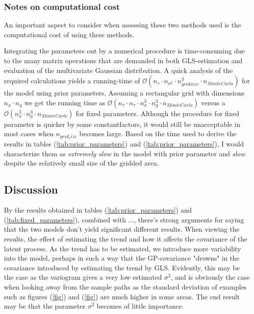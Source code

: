 \subsubsection{Notes on computational cost}
An important aspect to consider when assessing these two methods used is the computational cost of using these methods. 

Integrating the parameters out by a numerical procedure is time-consuming due to the many matrix operations that are demanded in both GLS-estimation and evaluation of the multivariate Gaussian distribution. A quick analysis of the required calculations yields a running-time of $\mathcal{O}(n_{\tau} \cdot n_{\sigma^2} \cdot n_{grid size}^3 \cdot n_{Monte Carlo})$ for the model using prior parameters. Assuming a rectangular grid with dimensions $n_x \cdot n_y$ we get the running time as $\mathcal{O}(n_{\tau} \cdot n_{\tau} \cdot n_{x}^3 \cdot n_{y}^3\cdot n_{Monte Carlo})$ versus a $\mathcal{O}(n_{x}^3 \cdot n_{y}^3\cdot n_{Monte Carlo})$ for fixed parameters. Although the procedure for fixed parameter is quicker by some constantfactors, it would still be unacceptable in most cases when $n_{grid_size}$ becomes large. Based on the time used to derive the results in tables (\ref{tab:prior_parameters}) and (\ref{tab:prior_parameters}), I would characterize them as \textit{extremely slow} in the model with prior parameter and \textit{slow} despite the relatively small size of the gridded area. 

\subsection{Discussion}
By the results obtained in tables (\ref{tab:prior_parameters}) and (\ref{tab:fixed_parameters}), combined with ..., there's strong arguments for saying that the two models don't yield significant different results. When viewing the results, the effect of estimating the trend and how it affects the covariance of the latent process. As the trend has to be estimated, we introduce more variability into the model, perhaps in such a way that the GP-covariance "drowns" in the covariance introduced by estimating the trend by GLS. Evidently, this may be the case as the variogram gives a very low estimated $\sigma^2$, and is obviously the case when looking away from the sample paths as the standard deviation of examples such as figures (\ref{fig}) and (\ref{fig}) are much higher in some areas. The end result may be that the parameter $\sigma^2$ becomes of little importance.

